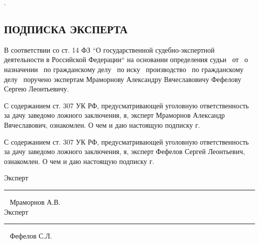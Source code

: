 .
\vspace{30mm}

\begin{center}
	\section{{\Large \textbf{ПОДПИСКА      ЭКСПЕРТА}}}
\end{center}



В соответствии со ст. 14  ФЗ “О государственной судебно-экспертной деятельности в Российской Федерации“ на основании определения судьи \sud \,  от \dataopr  \, о назначении \opr \, по гражданскому делу \delonum \, по иску \isk \,  производство \opr \, по гражданскому делу \delonum \, поручено экспертам   Мраморнову Александру Вячеславовичу Фефелову Сергею Леонтьевичу. 

\vspace{5mm}

С содержанием ст. 307 УК РФ, предусматривающей уголовную ответственность за дачу заведомо ложного заключения, я, эксперт Мраморнов Александр Вячеславович, ознакомлен.  О  чем и даю настоящую подписку \datastart г.

С содержанием ст. 307 УК РФ, предусматривающей уголовную ответственность за дачу заведомо ложного заключения, я, эксперт Фефелов Сергей Леонтьевич, ознакомлен.  О  чем и даю настоящую подписку \datastart г.



\vspace{30mm}

{Эксперт}\hfill      \rule{4cm}{0.1 mm} \,\,\,      {Мраморнов А.В.}\\
\vspace{15mm}
{Эксперт}\hfill      \rule{4cm}{0.1 mm} \,\,\,      {Фефелов С.Л.}